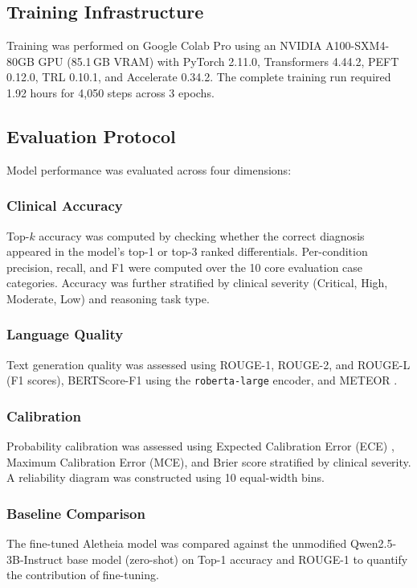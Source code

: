 \documentclass[journal]{IEEEtran}
\begin{document}
\subsection{Training Infrastructure}

Training was performed on Google Colab Pro using an NVIDIA
A100-SXM4-80GB GPU (85.1\,GB VRAM) with PyTorch 2.11.0,
Transformers 4.44.2, PEFT 0.12.0, TRL 0.10.1, and
Accelerate 0.34.2. The complete training run required 1.92 hours
for 4{,}050 steps across 3 epochs.

\subsection{Evaluation Protocol}

Model performance was evaluated across four dimensions:

\subsubsection{Clinical Accuracy}
Top-$k$ accuracy was computed by checking whether the correct
diagnosis appeared in the model's top-1 or top-3 ranked
differentials. Per-condition precision, recall, and F1 were
computed over the 10 core evaluation case categories. Accuracy
was further stratified by clinical severity (Critical, High,
Moderate, Low) and reasoning task type.

\subsubsection{Language Quality}
Text generation quality was assessed using ROUGE-1, ROUGE-2,
and ROUGE-L \cite{lin2004rouge} (F1 scores), BERTScore-F1
\cite{zhang2019bertscore} using the \texttt{roberta-large} encoder,
and METEOR \cite{banerjee2005meteor}.

\subsubsection{Calibration}
Probability calibration was assessed using Expected Calibration
Error (ECE) \cite{naeini2015ece}, Maximum Calibration Error (MCE),
and Brier score \cite{brier1950brier} stratified by clinical
severity. A reliability diagram was constructed using 10 equal-width
bins.

\subsubsection{Baseline Comparison}
The fine-tuned Aletheia model was compared against the unmodified
Qwen2.5-3B-Instruct base model (zero-shot) on Top-1 accuracy and
ROUGE-1 to quantify the contribution of fine-tuning.
\end{document}
